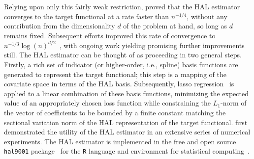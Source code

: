 Relying upon only this fairly weak restriction, \citet{vdl2015generally,
vdl2017generally} proved that the HAL estimator converges to the target
functional at a rate faster than $n^{-1/4}$, without any contribution from the
dimensionality $d$ of the problem at hand, so long as $d$ remains fixed.
Subsequent efforts improved this rate of convergence to $n^{-1/3}
\log(n)^{d/2}$~\citep{bibaut2019fast}, with ongoing work yielding promising
further improvements still. The HAL estimator can be thought of as proceeding in
two general steps. Firstly, a rich set of indicator (or higher-order, i.e.,
spline) basis functions are generated to represent the target functional; this
step is a mapping of the covariate space in terms of the HAL basis.
Subsequently, lasso regression~\citep{tibshirani1996regression} is applied to
a linear combination of these basis functions, minimizing the expected value of
an appropriately chosen loss function while constraining the $L_1$-norm of the
vector of coefficients to be bounded by a finite constant matching the sectional
variation norm of the HAL representation of the target functional.
\citet{benkeser2016highly} first demonstrated the utility of the HAL estimator
in an extensive series of numerical experiments. The HAL estimator is
implemented in the free and open source \texttt{hal9001}
package~\citep{coyle2020hal9001-rpkg, hejazi2020hal9001-joss} for the \texttt{R}
language and environment for statistical computing~\citep{R}.

